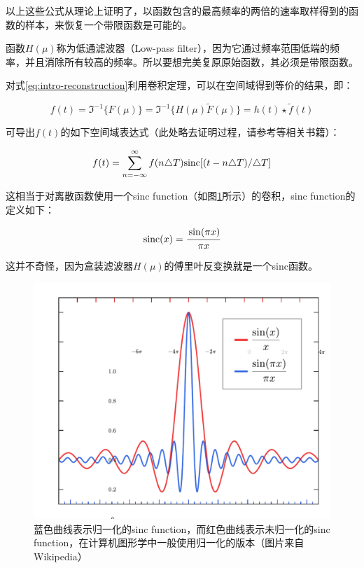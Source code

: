\noindent 以上这些公式从理论上证明了，以函数包含的最高频率的两倍的速率取样得到的函数的样本，来恢复一个带限函数是可能的。

函数$H(\mu)$称为低通滤波器（Low-pass filter），因为它通过频率范围低端的频率，并且消除所有较高的频率。所以要想完美复原原始函数，其必须是带限函数。

对式\ref{eq:intro-reconstruction}利用卷积定理，可以在空间域得到等价的结果，即：

\begin{equation}
	f(t)=\Im^{-1}\{F(\mu)\}=\Im^{-1}\{H(\mu)\tilde{F}(\mu) \}=h(t)\star\tilde{f}(t)
\end{equation}

\noindent 可导出$f(t)$的如下空间域表达式（此处略去证明过程，请参考\cite{b:DigitalImageProcessing}等相关书籍）：

\begin{equation}\label{eq:intro-reconstruction-1}
	f(t)=\sum^{\infty}_{n=-\infty}f(n\triangle T) {\rm sinc}[(t-n\triangle T)/\triangle T]
\end{equation}

\noindent 这相当于对离散函数使用一个sinc function（如图\ref{f:intro-sinc}所示）的卷积，sinc function的定义如下：

\begin{equation}
	{\rm sinc}(x)= \cfrac{\sin (\pi x)}{\pi x}
\end{equation}

\noindent 这并不奇怪，因为盒装滤波器$H(\mu)$的傅里叶反变换就是一个sinc函数。

\begin{figure}
\sidecaption
	\includegraphics[width=.65\textwidth]{figures/intro/sinc}
	\caption{蓝色曲线表示归一化的sinc function，而红色曲线表示未归一化的sinc function，在计算机图形学中一般使用归一化的版本（图片来自Wikipedia）}
	\label{f:intro-sinc}
\end{figure}

